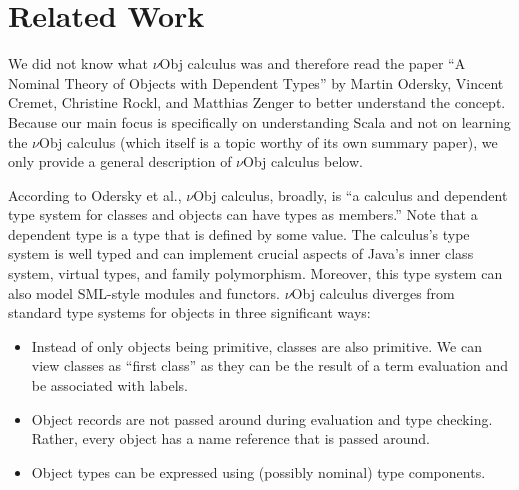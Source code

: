 \documentclass[jou,apacite]{IEEEtran}
\begin{document}
\section{Related Work}
\label{sec:related-work}

We did not know what $\nu$Obj calculus was and therefore read the paper “A
Nominal Theory of Objects with Dependent Types” by Martin Odersky, Vincent
Cremet, Christine Rockl, and Matthias Zenger to better understand the
concept. Because our main focus is specifically on understanding Scala and not
on learning the $\nu$Obj calculus (which itself is a topic worthy of its own
summary paper), we only provide a general description of $\nu$Obj calculus
below.
  
According to Odersky et al., $\nu$Obj calculus, broadly, is “a calculus and
dependent type system for classes and objects can have types as members.” Note
that a dependent type is a type that is defined by some value. The calculus’s
type system is well typed and can implement crucial aspects of Java’s inner
class system, virtual types, and family polymorphism. Moreover, this type system
can also model SML-style modules and functors. $\nu$Obj calculus diverges from
standard type systems for objects in three significant ways:

\begin{itemize}
\item Instead of only objects being primitive, classes are also primitive. We
  can view classes as “first class” as they can be the result of a term
  evaluation and be associated with labels.
\item Object records are not passed around during evaluation and type
  checking. Rather, every object has a name reference that is passed around.
\item Object types can be expressed using (possibly nominal) type components.
\end{itemize}
  
\end{document}
